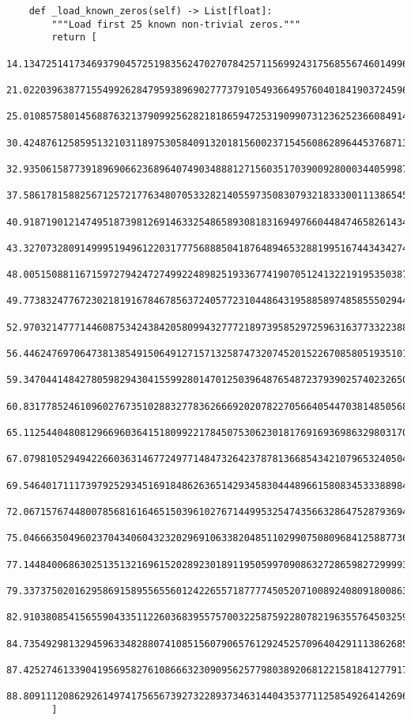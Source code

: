 \documentclass[12pt]{article}
\begin{document}
\begin{lstlisting}
    def _load_known_zeros(self) -> List[float]:
        """Load first 25 known non-trivial zeros."""
        return [
            14.134725141734693790457251983562470270784257115699243175685567460149963429809256764949010393171561,
            21.022039638771554992628479593896902777379105493664957604018419037245964711887969276237222861695857,
            25.010857580145688763213790992562821818659472531909907312362523660849141927374350819308900983026706,
            30.424876125859513210311897530584091320181560023715456086289644537687136284537827031203852652557833,
            32.935061587739189690662368964074903488812715603517039009280003440599878954915613382862099926409603,
            37.586178158825671257217763480705332821405597350830793218333001113865459321587313806420680229669450,
            40.918719012147495187398126914633254865893081831694976604484746582614347925046144920403126144816385,
            43.327073280914999519496122031777568885041876489465328819951674434342745615004109641454501231649417,
            48.005150881167159727942472749922489825193367741907051241322191953503870010511878228540195560253815,
            49.773832477672302181916784678563724057723104486431958858974858555029448348913560673351635632292498,
            52.970321477714460875342438420580994327772189739585297259631637733223889192869875918554916992157252,
            56.446247697064738138549150649127157132587473207452015226708580519351018682408745194303120561678796,
            59.347044148427805982943041559928014701250396487654872379390257402326506661593588707390626913488554,
            60.831778524610960276735102883277836266692020782270566405447038148505689673902606751459017637272109,
            65.112544048081296696036415180992217845075306230181769169369863298031708949969370043383703141878788,
            67.079810529494226603631467724977148473264237878136685434210796532405041028023169778412847382835049,
            69.546401711173979252934516918486263651429345830444896615808345333889840269806726062353135999748299,
            72.067157674480078568161646515039610276714499532547435663286475287936942126532153142384473381963506,
            75.046663504960237043406043232029691063382048511029907508096841258877368116796159610515707708847967,
            77.144840068630251351321696152028923018911950599709086327286598272999930889416901410561245225805985,
            79.337375020162958691589556556012422655718777745052071008924080918008634827261512934069302690044044,
            82.910380854156559043351122603683955757003225875922807821963557645032596767809311982577715830706329,
            84.735492981329459633482880741085156079065761292452570964042911138626852719987543149922847766977651,
            87.425274613390419569582761086663230909562577980389206812215818412779178742281869651941945991858920,
            88.809111208629261497417565673927322893734631440435377112585492641426961818547544070019084680058508
        ]


\end{lstlisting}
\end{document}
